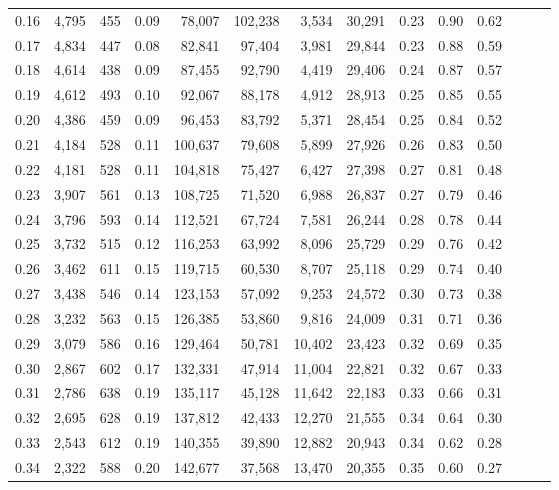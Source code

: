 \begin{tabular}{rrrrrrrrrrrrrr}
0.16 &  4,795 &  455 &  0.09 &   78,007 &  102,238 &   3,534 &  30,291 &  0.23 &  0.90 &      0.62 \\
0.17 &  4,834 &  447 &  0.08 &   82,841 &   97,404 &   3,981 &  29,844 &  0.23 &  0.88 &      0.59 \\
0.18 &  4,614 &  438 &  0.09 &   87,455 &   92,790 &   4,419 &  29,406 &  0.24 &  0.87 &      0.57 \\
0.19 &  4,612 &  493 &  0.10 &   92,067 &   88,178 &   4,912 &  28,913 &  0.25 &  0.85 &      0.55 \\
0.20 &  4,386 &  459 &  0.09 &   96,453 &   83,792 &   5,371 &  28,454 &  0.25 &  0.84 &      0.52 \\
0.21 &  4,184 &  528 &  0.11 &  100,637 &   79,608 &   5,899 &  27,926 &  0.26 &  0.83 &      0.50 \\
0.22 &  4,181 &  528 &  0.11 &  104,818 &   75,427 &   6,427 &  27,398 &  0.27 &  0.81 &      0.48 \\
0.23 &  3,907 &  561 &  0.13 &  108,725 &   71,520 &   6,988 &  26,837 &  0.27 &  0.79 &      0.46 \\
0.24 &  3,796 &  593 &  0.14 &  112,521 &   67,724 &   7,581 &  26,244 &  0.28 &  0.78 &      0.44 \\
0.25 &  3,732 &  515 &  0.12 &  116,253 &   63,992 &   8,096 &  25,729 &  0.29 &  0.76 &      0.42 \\
0.26 &  3,462 &  611 &  0.15 &  119,715 &   60,530 &   8,707 &  25,118 &  0.29 &  0.74 &      0.40 \\
0.27 &  3,438 &  546 &  0.14 &  123,153 &   57,092 &   9,253 &  24,572 &  0.30 &  0.73 &      0.38 \\
0.28 &  3,232 &  563 &  0.15 &  126,385 &   53,860 &   9,816 &  24,009 &  0.31 &  0.71 &      0.36 \\
0.29 &  3,079 &  586 &  0.16 &  129,464 &   50,781 &  10,402 &  23,423 &  0.32 &  0.69 &      0.35 \\
0.30 &  2,867 &  602 &  0.17 &  132,331 &   47,914 &  11,004 &  22,821 &  0.32 &  0.67 &      0.33 \\
0.31 &  2,786 &  638 &  0.19 &  135,117 &   45,128 &  11,642 &  22,183 &  0.33 &  0.66 &      0.31 \\
0.32 &  2,695 &  628 &  0.19 &  137,812 &   42,433 &  12,270 &  21,555 &  0.34 &  0.64 &      0.30 \\
0.33 &  2,543 &  612 &  0.19 &  140,355 &   39,890 &  12,882 &  20,943 &  0.34 &  0.62 &      0.28 \\
0.34 &  2,322 &  588 &  0.20 &  142,677 &   37,568 &  13,470 &  20,355 &  0.35 &  0.60 &      0.27 \\

\end{tabular}
